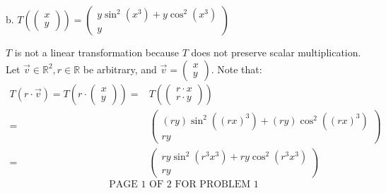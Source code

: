 \documentclass[12pt]{article}
\newenvironment{problem}[2][Problem]
{
	\begin{trivlist} 
		\item[\hskip \labelsep {\bfseries #1 #2:}]
	}
{
	\end{trivlist}
	}
\newenvironment{solution}[1][Solution]
{
	\begin{trivlist} 
		\item[\hskip \labelsep {\itshape #1:}]
	}
	{
	\end{trivlist}
}
\begin{document}
\begin{problem}{1}
\noindent
\newline
\newline
b.  $T \left( \begin{pmatrix} x \\ y\end{pmatrix} \right) = \begin{pmatrix} y \sin ^2 (x^3) + y \cos ^2 (x^3)\\ y\end{pmatrix}$
\begin{solution}
$T$ is not a linear transformation because $T$ does not preserve scalar multiplication. Let $\vec{v} \in \mathbb{R}^2, r \in \mathbb{R}$ be arbitrary, and $\vec{v} = \begin{pmatrix} x \\ y \end{pmatrix}$. Note that:
\begin{align*}
T (r \cdot \vec{v}) = T (r \cdot \begin{pmatrix} x \\ y \end{pmatrix}) =& T (\begin{pmatrix} r \cdot x \\ r \cdot y \end{pmatrix})\\
=& \begin{pmatrix} (ry) \sin ^2 ((rx)^3) + (ry) \cos ^2 ((rx)^3)\\ ry\end{pmatrix}\\
=& \begin{pmatrix} ry \sin ^2 (r^3 x^3) + ry \cos ^2 (r^3 x^3)\\ ry\end{pmatrix}
\end{align*}
\[
\text{PAGE 1 OF 2 FOR PROBLEM 1}
\]
\end{solution}
\end{problem}
\end{document}

